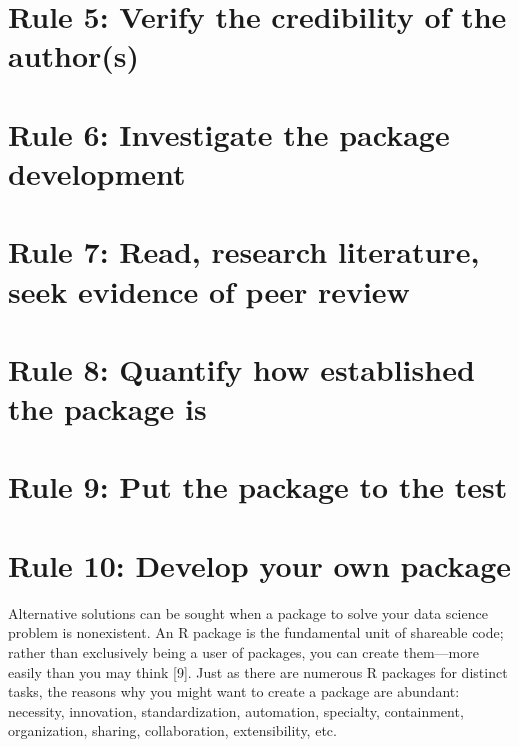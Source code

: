 \documentclass[10pt,letterpaper]{article}
\begin{document}
\hypertarget{rule-5-verify-the-credibility-of-the-authors}{%
\section{Rule 5: Verify the credibility of the
author(s)}\label{rule-5-verify-the-credibility-of-the-authors}}

\hypertarget{rule-6-investigate-the-package-development}{%
\section{Rule 6: Investigate the package
development}\label{rule-6-investigate-the-package-development}}

\hypertarget{rule-7-read-research-literature-seek-evidence-of-peer-review}{%
\section{Rule 7: Read, research literature, seek evidence of peer
review}\label{rule-7-read-research-literature-seek-evidence-of-peer-review}}

\hypertarget{rule-8-quantify-how-established-the-package-is}{%
\section{Rule 8: Quantify how established the package
is}\label{rule-8-quantify-how-established-the-package-is}}

\hypertarget{rule-9-put-the-package-to-the-test}{%
\section{Rule 9: Put the package to the
test}\label{rule-9-put-the-package-to-the-test}}

\hypertarget{rule-10-develop-your-own-package}{%
\section{Rule 10: Develop your own
package}\label{rule-10-develop-your-own-package}}

Alternative solutions can be sought when a package to solve your data
science problem is nonexistent. An R package is the fundamental unit of
shareable code; rather than exclusively being a user of packages, you
can create them---more easily than you may think {[}9{]}. Just as there
are numerous R packages for distinct tasks, the reasons why you might
want to create a package are abundant: necessity, innovation,
standardization, automation, specialty, containment, organization,
sharing, collaboration, extensibility, etc.
\end{document}
